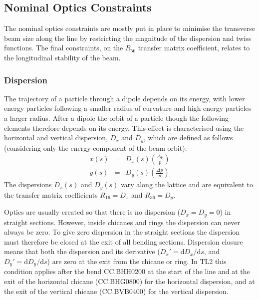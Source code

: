 \subsection{Nominal Optics Constraints}
\label{ss:nominalOpticsReqs}

The nominal optics constraints are mostly put in place to minimise the transverse beam size along the line by restricting the magnitude of the dispersion and twiss functions. The final constraints, on the \(R_{56}\) transfer matrix coefficient, relates to the longitudinal stability of the beam.

\subsubsection{Dispersion}

The trajectory of a particle through a dipole depends on its energy, with lower energy particles following a smaller radius of curvature and high energy particles a larger radius. After a dipole the orbit of a particle though the following elements therefore depends on its energy. This effect is characterised using the horizontal and vertical dispersion, \(D_x\) and \(D_y\), which are defined as follows (considering only the energy component of the beam orbit):
\begin{eqnarray}
x(s) &=& D_x(s)\left(\frac{\Delta p}{p}\right) \\
y(s) &=& D_y(s)\left(\frac{\Delta p}{p}\right)
\end{eqnarray}
The dispersions \(D_x(s)\) and \(D_y(s)\) vary along the lattice and are equivalent to the transfer matrix coefficients \(R_{16} = D_x\) and \(R_{36} = D_y\). 

Optics are usually created so that there is no dispersion (\(D_{x} = D_{y} = 0\)) in straight sections. However, inside chicanes and rings the dispersion can never always be zero. To give zero dispersion in the straight sections the dispersion must therefore be closed at the exit of all bending sections. Dispersion closure means that both the dispersion and its derivative (\(D_x' = \mathrm{d}D_x/\mathrm{d}s\), and \(D_y' = \mathrm{d}D_y/\mathrm{d}s\)) are zero at the exit from the chicane or ring. In TL2 this condition applies after the bend CC.BHH0200 at the start of the line and at the exit of the horizontal chicane (CC.BHG0800) for the horizontal dispersion, and at the exit of the vertical chicane (CC.BVB0400) for the vertical dispersion.

